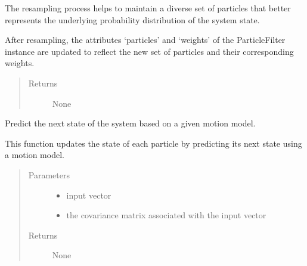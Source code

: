 \documentclass[letterpaper,10pt,english]{sphinxmanual}
\begin{document}
\begin{fulllineitems}
\begin{fulllineitems}
\sphinxAtStartPar
The resampling process helps to maintain a diverse set of particles that better represents the underlying
probability distribution of the system state.

\sphinxAtStartPar
After resampling, the attributes ‘particles’ and ‘weights’ of the ParticleFilter instance are updated
to reflect the new set of particles and their corresponding weights.
\begin{quote}\begin{description}
\item[{Returns}] \leavevmode
\sphinxAtStartPar
None

\end{description}\end{quote}

\end{fulllineitems}


\begin{fulllineitems}
\label{\detokenize{particle_filter:ParticleFilter.ParticleFilter.Prediction}}
\sphinxAtStartPar
Predict the next state of the system based on a given motion model.

\sphinxAtStartPar
This function updates the state of each particle by predicting its next state using a motion model.
\begin{quote}\begin{description}
\item[{Parameters}] \leavevmode\begin{itemize}
\item {} 
\sphinxAtStartPar
{} \textendash{} input vector

\item {} 
\sphinxAtStartPar
{} \textendash{} the covariance matrix associated with the input vector

\end{itemize}

\item[{Returns}] \leavevmode
\sphinxAtStartPar
None

\end{description}\end{quote}


\end{fulllineitems}
\end{fulllineitems}
\end{document}
